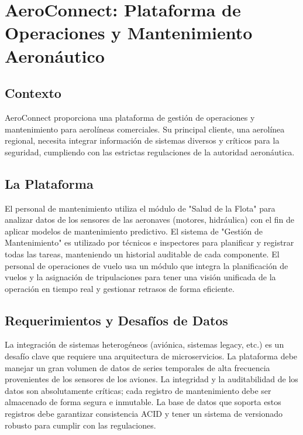 \documentclass[12pt]{article}
\begin{document}
\newpage

\section{AeroConnect: Plataforma de Operaciones y Mantenimiento Aeronáutico}

\subsection{Contexto}
AeroConnect proporciona una plataforma de gestión de operaciones y mantenimiento para aerolíneas comerciales. Su principal cliente, una aerolínea regional, necesita integrar información de sistemas diversos y críticos para la seguridad, cumpliendo con las estrictas regulaciones de la autoridad aeronáutica.

\subsection{La Plataforma}
El personal de mantenimiento utiliza el módulo de "Salud de la Flota" para analizar datos de los sensores de las aeronaves (motores, hidráulica) con el fin de aplicar modelos de mantenimiento predictivo. El sistema de "Gestión de Mantenimiento" es utilizado por técnicos e inspectores para planificar y registrar todas las tareas, manteniendo un historial auditable de cada componente. El personal de operaciones de vuelo usa un módulo que integra la planificación de vuelos y la asignación de tripulaciones para tener una visión unificada de la operación en tiempo real y gestionar retrasos de forma eficiente.

\subsection{Requerimientos y Desafíos de Datos}
La integración de sistemas heterogéneos (aviónica, sistemas legacy, etc.) es un desafío clave que requiere una arquitectura de microservicios. La plataforma debe manejar un gran volumen de datos de series temporales de alta frecuencia provenientes de los sensores de los aviones. La integridad y la auditabilidad de los datos son absolutamente críticas; cada registro de mantenimiento debe ser almacenado de forma segura e inmutable. La base de datos que soporta estos registros debe garantizar consistencia ACID y tener un sistema de versionado robusto para cumplir con las regulaciones.
\end{document}

